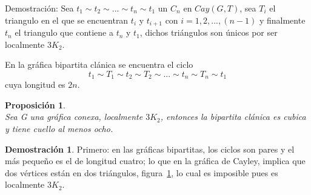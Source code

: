 \documentclass[12pt]{book}
\newtheorem{proposition}{Proposición}
\theoremstyle{definition}
\newtheorem{demostration}{Demostración}
\begin{document}
Demostración: Sea $t_1\sim t_2\sim ... \sim t_n \sim t_1$ un $C_n$ en
$Cay(G,T)$, sea $T_i$ el triangulo en el que se encuentran $t_i$ y
$t_{i+1}$ con $i=1,2,...,(n-1)$ y finalmente $t_n$ el triangulo que
contiene a $t_n$ y $t_1$, dichos triángulos son únicos por ser
localmente $3K_2$.

En la gráfica bipartita clánica se encuentra el ciclo
$$t_1\sim T_1\sim t_2 \sim T_2 \sim ... \sim t_n \sim T_n \sim t_1$$
cuya longitud es $2n$.


\begin{proposition}\textbf{}\\
  Sea G una gráfica conexa, localmente $3K_2$, entonces la bipartita
  clánica es cubica y tiene cuello al menos ocho.\label{cuello8omas}
\end{proposition}


\begin{demostration}Primero: en las gráficas bipartitas, los ciclos
  son pares y el más pequeño es el de longitud cuatro; lo que en la
  gráfica de Cayley, implica que dos vértices están en dos triángulos,
  figura~\ref{bipcuello4}, lo cual es imposible pues es localmente
  $3K_2$.

\begin{figure}[htb]
  \centering
  \caption{} \label{bipcuello4}
\end{figure}



\begin{figure}\centering
  \caption{}\label{bipciclo6}
\end{figure}





\end{demostration}
\end{document}
